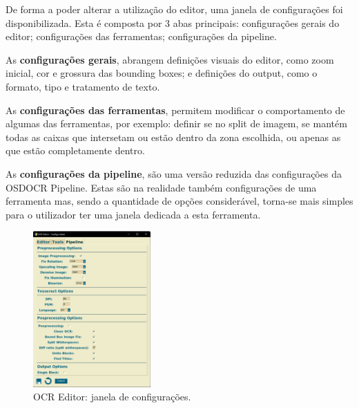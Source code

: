 
De forma a poder alterar a utilização do editor, uma janela de configurações foi disponibilizada. Esta é composta por 3 abas principais: configurações gerais do editor; configurações das ferramentas; configurações da pipeline.

As \textbf{configurações gerais}, abrangem definições visuais do editor, como zoom inicial, cor e grossura das bounding boxes; e definições do output, como o formato, tipo e tratamento de texto.

As \textbf{configurações das ferramentas}, permitem modificar o comportamento de algumas das ferramentas, por exemplo: definir se no split de imagem, se mantém todas as caixas que intersetam ou estão dentro da zona escolhida, ou apenas as que estão completamente dentro.

As \textbf{configurações da pipeline}, são uma versão reduzida das configurações da OSDOCR Pipeline. Estas são na realidade também configurações de uma ferramenta mas, sendo a quantidade de opções considerável, torna-se mais simples para o utilizador ter uma janela dedicada a esta ferramenta.


\begin{figure}[H]
	\centering
	\includegraphics[width=0.4\textwidth]{images/ilustracoes/ocr_editor_configurations.png}
	\caption{OCR Editor: janela de configurações.}
	\label{fig:ocr_editor_configurations}
\end{figure}










